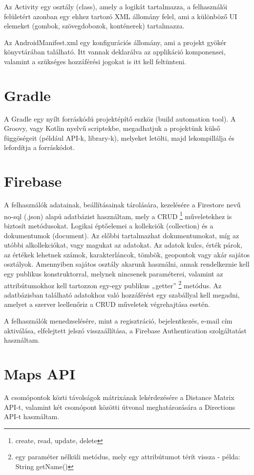 Az Activity egy osztály (class), amely a logikát tartalmazza, a felhasználói felületért azonban egy ehhez tartozó XML állomány felel, ami a különböző UI elemeket (gombok, szövegdobozok, konténerek) tartalmazza.

Az AndroidManifest.xml egy konfigurációs állomány, ami a projekt gyökér könyvtárában található. Itt vannak deklarálva az applikáció komponensei, valamint a szükséges hozzáférési jogokat is itt kell feltünteni.



\section{Gradle}\label{sec:ALAP:adatelem}

A Gradle egy nyílt forráskódú projektépítő eszköz (build automation tool). A Groovy, vagy Kotlin nyelvű scriptekbe, megadhatjuk a projektünk külső függöségeit (például API-k, library-k), melyeket letölti, majd lekompillálja és lefordítja a forráskódot.

\section{Firebase}\label{sec:ALAP:szerkeszt}

A felhasználók adatainak, beállításainak tárolására, kezelésére a Firestore nevű no-sql (.json) alapú adatbázist használtam, mely a CRUD%
\footnote{ %
	create, read, update, delete
}  %
 műveletekhez is biztosít metódusokat. Logikai éptőelemei a kollekciók (collection) és a dokumentumok (document). Az előbbi tartalmazhat dokumentumokat, míg az utóbbi alkollekciókat, vagy magukat az adatokat. Az adatok kulcs, érték párok, az értékek lehetnek számok, karakterláncok, tömbök, geopontok vagy akár sajátos osztályok. Amennyiben sajátos osztály akarunk használni, annak rendelkeznie kell egy publikus konstruktorral, melynek nincsenek paraméterei, valamint az attribútumokhoz kell tartozzon egy-egy publikus „getter”%
 \footnote{ %
 	egy paraméter nélküli metódus, mely egy attribútumot térít vissza - példa: String getName()
 }  %
 metódus. Az adatbázisban található adatokhoz való hozzáférést egy szabállyal kell megadni, amelyet a szerver leellenőriz a CRUD műveletek végrehajtása esetén.

A felhasználók menedzselésére, mint a regisztráció, bejelentkezés, e-mail cím aktiválása, elfelejtett jelszó visszaállítása, a Firebase Authentication szolgáltatást használtam.


\section{Maps API}\label{sec:ALAP:szerkeszt}

A csomópontok közti távolságok mátrixának lekérdezésére a Distance Matrix API-t, valamint két csomópont közötti útvonal meghatározására a Directions API-t használtam.
